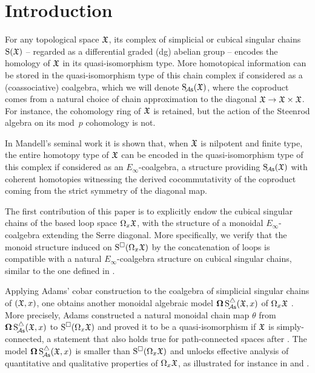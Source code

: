 
\section{Introduction}

For any topological space $\mathfrak{X}$, its complex of simplicial or cubical singular chains $\operatorname{S}(\mathfrak{X})$ -- regarded as a differential graded (dg) abelian group -- encodes the homology of $\mathfrak{X}$ in its quasi-isomorphism type.
More homotopical information can be stored in the quasi-isomorphism type of this chain complex if considered as a (coassociative) coalgebra, which we will denote $\operatorname{S_{\!{\mathcal{A}\mathsf{s}}}}(\mathfrak{X})$, where the coproduct comes from a natural choice of chain approximation to the diagonal $\mathfrak{X} \to \mathfrak{X} \times \mathfrak{X}$.
For instance, the cohomology ring of $\mathfrak{X}$ is retained, but the action of the Steenrod algebra on its mod~$p$ cohomology is not.

In Mandell's seminal work \cite{mandell2006homotopy_type} it is shown that, when $\mathfrak{X}$ is nilpotent and finite type, the entire homotopy type of $\mathfrak{X}$ can be encoded in the quasi-isomorphism type of this complex if considered as an $E_\infty$-coalgebra, a structure providing $\operatorname{S_{\!{\mathcal{A}\mathsf{s}}}}(\mathfrak{X})$ with coherent homotopies witnessing the derived cocommutativity of the coproduct coming from the strict symmetry of the diagonal map.

The first contribution of this paper is to explicitly endow the cubical singular chains of the based loop space $\Omega_x \mathfrak{X}$, with the structure of a monoidal $E_\infty$-coalgebra extending the Serre diagonal.
More specifically, we verify that the monoid structure induced on $\operatorname{S^{\square}}(\Omega_x \mathfrak{X})$ by the concatenation of loops is compatible with a natural $E_\infty$-coalgebra structure on cubical singular chains, similar to the one defined in \cite{medina2022cube_einfty}.

Applying Adams' cobar construction to the coalgebra of simplicial singular chains of $(\mathfrak{X}, x)$, one obtains another monoidal algebraic model $\operatorname{\mathbf{\Omega}} \operatorname{S^{\triangle}_{\!{\mathcal{A}\mathsf{s}}}}(\mathfrak{X}, x)$ of $\Omega_x \mathfrak{X}$ \cite{adams1956cobar}.
More precisely, Adams constructed a natural monoidal chain map $\theta$ from $\operatorname{\mathbf{\Omega}} \operatorname{S^{\triangle}_{\!{\mathcal{A}\mathsf{s}}}}(\mathfrak{X}, x)$ to $\operatorname{S^{\square}}(\Omega_x \mathfrak{X})$ and proved it to be a quasi-isomorphism if $\mathfrak{X}$ is simply-connected, a statement that also holds true for path-connected spaces after \cite{rivera2018cubical}.
The model $\operatorname{\mathbf{\Omega}} \operatorname{S^{\triangle}_{\!{\mathcal{A}\mathsf{s}}}}(\mathfrak{X}, x)$ is smaller than $\operatorname{S^{\square}}(\Omega_x \mathfrak{X})$ and unlocks effective analysis of quantitative and qualitative properties of $\Omega_x \mathfrak{X}$, as illustrated for instance in \cite{chainalgebraloops} and \cite{adamscobarequivalence}.

